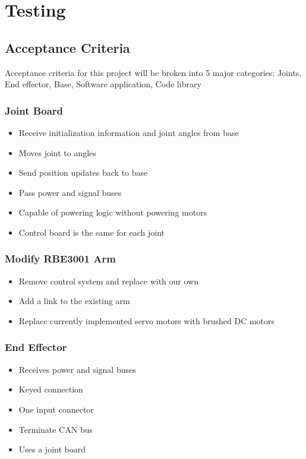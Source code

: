 \section{Testing}
\subsection{Acceptance Criteria}
Acceptance criteria for this project will be broken into 5 major categories: Joints, End effector, Base, Software application, Code library

\subsubsection{Joint Board}
\begin{itemize}
	\item Receive initialization information and joint angles from base
	\item Moves joint to angles
	\item Send position updates back to base
	\item Pass power and signal buses
	\item Capable of powering logic without powering motors
	\item Control board is the same for each joint
\end{itemize}

\subsubsection{Modify RBE3001 Arm}
\begin{itemize}
	\item Remove control system and replace with our own 
	\item Add a link to the existing arm
	\item Replace currently implemented servo motors with brushed DC motors
\end{itemize}

\subsubsection{End Effector}
\begin{itemize}
	\item Receives power and signal buses
	\item Keyed connection
	\item One input connector
	\item Terminate CAN bus
	\item Uses a joint board
\end{itemize}

